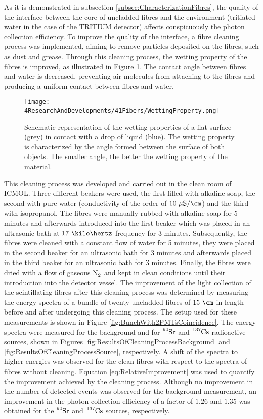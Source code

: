 As it is demonstrated in subsection \ref{subsec:CharacterizationFibres}, the quality of the interface between the core of uncladded fibres and the environment (tritiated water in the case of the TRITIUM detector) affects conspicuously the photon collection efficiency. To improve the quality of the interface, a fibre cleaning process was implemented, aiming to remove particles deposited on the fibres, such as dust and grease.  Through this cleaning process, the wetting property of the fibres is improved, as illustrated in Figure \ref{fig:WettingProperty}. The contact angle between fibres and water is decreased, preventing air molecules from attaching to the fibres and producing a uniform contact between fibres and water.
\begin{figure}[htbp]
\centering
\texttt{[image: 4ResearchAndDevelopments/41Fibers/WettingProperty.png]}
\caption{Schematic representation of the wetting properties of a flat surface (grey) in contact with a drop of liquid (blue). The wetting property is characterized by the angle formed between the surface of both objects. The smaller angle, the better the wetting property of the material. \cite{WettingProperty}\label{fig:WettingProperty}}
\end{figure}
This cleaning process  was developed and carried out in the clean room of ICMOL. Three different beakers were used, the first filled with alkaline soap, the second with pure water (conductivity of the order of $10~\mu\text{S}/\cm$) and the third with isopropanol. The fibres were manually rubbed with alkaline soap for 5 minutes and afterwards introduced into the first beaker which was placed in an ultrasonic bath at $17~\kilo\hertz$ frequency for 3 minutes. Subsequently, the fibres were cleaned with a constant flow of water for 5 minutes, they were placed in the second beaker for an ultrasonic bath for 3 minutes and afterwards placed in the third beaker for an ultrasonic bath for 3 minutes. Finally, the fibres were dried with a flow of gaseous $\ce{N_2}$ and kept in clean conditions until their introduction into the detector vessel. The improvement of the light collection of the scintillating fibres after this cleaning process was determined by measuring the energy spectra of a bundle of twenty uncladded fibres of $15~\cm$ in length before and after undergoing this cleaning process. The setup used for these measurements is shown in Figure \ref{fig:BunchWith2PMTsCoincidence}. The energy spectra were measured for the background and for $\ce{^{90}Sr}$ and $\ce{^{137}Cs}$ radioactive sources, shown in Figures \ref{fig:ResultsOfCleaningProcessBackground} and \ref{fig:ResultsOfCleaningProcessSource}, respectively. A shift of the spectra to higher energies was observed for the clean fibres with respect to the spectra of fibres without cleaning. Equation \ref{eq:RelativeImprovement} was used to quantify the improvement achieved by the cleaning process. Although no improvement in the number of detected events was observed for the background measurement, an improvement in the photon collection efficiency of a factor of $1.26$ and $1.35$ was obtained for the $\ce{^{90}Sr}$ and $\ce{^{137}Cs}$ sources, respectively.

